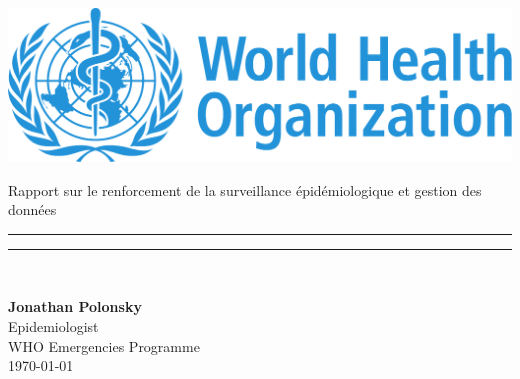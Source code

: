 \begin{titlepage}
\hspace*{-1cm}\begin{minipage}[0.1\textheight]{5cm}
\vspace{0pt}
\includegraphics[height=0.1\textheight]{../figure/logo_who}
\end{minipage}
\hspace*{1cm}\begin{minipage}{11.3cm}
\vspace{0pt}
\begin{flushright}
\begin{spacing}{1.0}
{\LARGE Rapport sur le renforcement de la surveillance épidémiologique et gestion des données}
\end{spacing}
\end{flushright}
\end{minipage}

\hspace*{-1cm}\begin{minipage}[t]{5cm}
\vspace{0pt}
\textcolor{whoblue!15}{\rule{5cm}{0.577\textheight}}
\end{minipage}
\hspace*{1cm}\begin{minipage}[t]{11.3cm}
\vspace{0pt}
\textcolor{whoblue}{\rule{11.3cm}{0.5mm}}\\[0.465\textheight]
\begin{flushright}
{\Large \bf{Jonathan Polonsky}}\\
{\Large Epidemiologist}\\
{\Large WHO Emergencies Programme}\\[0.5cm]
\cleanlookdateon \textsc{\large \today}
\end{flushright}
\end{minipage}

\end{titlepage}
